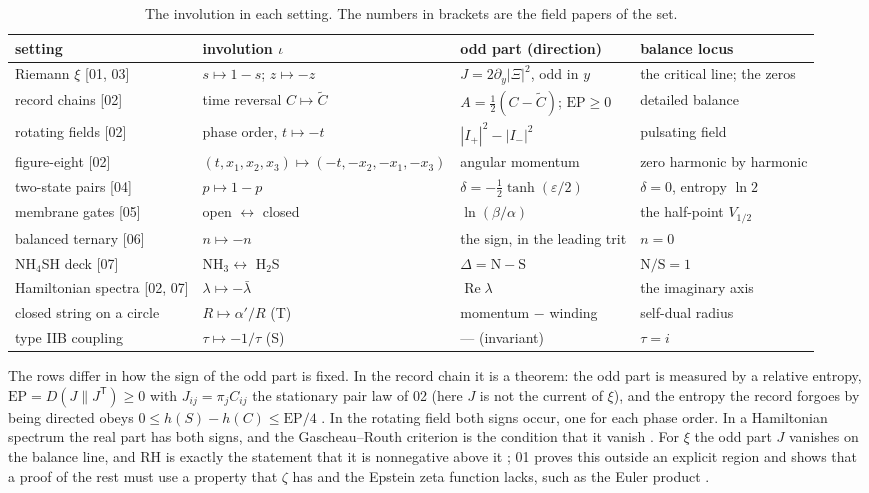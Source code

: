 \documentclass[11pt]{article}
\theoremstyle{definition}\newtheorem{definition}[theorem]{Definition}
\theoremstyle{remark}\newtheorem{remark}[theorem]{Remark}
\renewcommand{\Re}{\operatorname{Re}}\renewcommand{\Im}{\operatorname{Im}}
\begin{document}
\begin{table}[!htb]\centering\small
\caption{The involution in each setting. The numbers in brackets are the field papers of the set.}\label{tab:inv}
\begin{tabular}{@{}p{3.3cm}p{3.6cm}p{3.9cm}p{3.8cm}@{}}\toprule
setting & involution $\iota$ & odd part (direction) & balance locus\\\midrule
Riemann $\xi$ [01, 03] & $s\mapsto1-s$; $z\mapsto-z$ & $J=2\partial_y|\Xi|^2$, odd in $y$ & the critical line; the zeros\\
record chains [02] & time reversal $C\mapsto\tilde C$ & $A=\frac12(C-\tilde C)$; $\mathrm{EP}\ge0$ & detailed balance\\
rotating fields [02] & phase order, $t\mapsto-t$ & $|I_+|^2-|I_-|^2$ & pulsating field\\
figure-eight [02] & $(t,x_1,x_2,x_3)\mapsto(-t,-x_2,-x_1,-x_3)$ & angular momentum & zero harmonic by harmonic\\
two-state pairs [04] & $p\mapsto1-p$ & $\delta=-\frac12\tanh(\varepsilon/2)$ & $\delta=0$, entropy $\ln2$\\
membrane gates [05] & open $\leftrightarrow$ closed & $\ln(\beta/\alpha)$ & the half-point $V_{1/2}$\\
balanced ternary [06] & $n\mapsto-n$ & the sign, in the leading trit & $n=0$\\
NH$_4$SH deck [07] & NH$_3\leftrightarrow$ H$_2$S & $\Delta=\mathrm N-\mathrm S$ & $\mathrm N/\mathrm S=1$\\
Hamiltonian spectra [02, 07] & $\lambda\mapsto-\bar\lambda$ & $\Re\lambda$ & the imaginary axis\\
closed string on a circle & $R\mapsto\alpha'/R$ (T) & momentum $-$ winding & self-dual radius\\
type IIB coupling & $\tau\mapsto-1/\tau$ (S) & --- (invariant) & $\tau=i$\\
\bottomrule
\end{tabular}
\end{table}

The rows differ in how the sign of the odd part is fixed. In the record chain it is a theorem: the odd part is measured by a relative entropy, $\mathrm{EP}=D(J\|J^{\mathsf T})\ge0$ with $J_{ij}=\pi_jC_{ij}$ the stationary pair law of 02 (here $J$ is not the current of $\xi$), and the entropy the record forgoes by being directed obeys $0\le h(S)-h(C)\le\mathrm{EP}/4$ \cite{SPhys}. In the rotating field both signs occur, one for each phase order. In a Hamiltonian spectrum the real part has both signs, and the Gascheau--Routh criterion is the condition that it vanish \cite{SPhys,SPlanet}. For $\xi$ the odd part $J$ vanishes on the balance line, and RH is exactly the statement that it is nonnegative above it \cite{SD,Lagarias}; 01 proves this outside an explicit region and shows that a proof of the rest must use a property that $\zeta$ has and the Epstein zeta function lacks, such as the Euler product \cite{SMath}.
\end{document}
